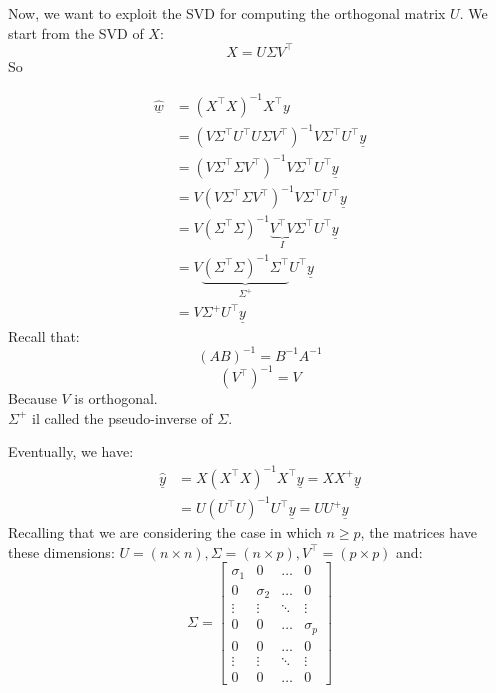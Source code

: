 Now, we want to exploit the SVD for computing the orthogonal matrix $U$. We start from the SVD of $X$:
\[
    X = U\Sigma V^\intercal    
\]
So
\begin{multicols}{2}
    \[
    \begin{split}
        \underline{\hat{w}} &= (X^\intercal X)^{-1} X^\intercal y\\
        & = (V\Sigma^\intercal U^\intercal U\Sigma V^\intercal)^{-1} V\Sigma^\intercal U^\intercal \underline{y} \\
        & = (V\Sigma^\intercal \Sigma V^\intercal)^{-1} V\Sigma^\intercal U^\intercal \underline{y}\\
        & = V(V\Sigma^\intercal \Sigma V^\intercal)^{-1} V\Sigma^\intercal U^\intercal \underline{y}\\
        & = V(\Sigma^\intercal \Sigma)^{-1} \underbrace{V^\intercal V}_{I}\Sigma^\intercal U^\intercal \underline{y}\\
        & = V\underbrace{(\Sigma^\intercal \Sigma)^{-1} \Sigma^\intercal}_{\Sigma^+} U^\intercal \underline{y}\\ 
        & = V\Sigma^+ U^\intercal \underline{y}
    \end{split}
\]
Recall that:
\[
(AB)^{-1} = B^{-1} A^{-1}    
\]
\[
(V^\intercal)^{-1} = V     
\]
Because $V$ is orthogonal.\\
$\Sigma^+$ il called the pseudo-inverse of $\Sigma$.
\end{multicols}
Eventually, we have:
\[
    \begin{split}
        \underline{\hat{y}} &= X(X^\intercal X)^{-1} X^\intercal \underline{y} = XX^+ \underline{y}\\ 
        &= U(U^\intercal U)^{-1} U^\intercal \underline{y} = UU^+ \underline{y}
    \end{split}
\]
Recalling that we are considering the case in which $n \geq p$, the matrices have these dimensions: $U = (n \times n), \Sigma = (n \times p), V^\intercal = (p \times p)$ and:
\[
    \Sigma = \begin{bmatrix}
        \sigma_1 & 0 & \dots & 0\\
        0 & \sigma_2 & \dots & 0\\
        \vdots & \vdots & \ddots & \vdots\\
        0 & 0 & \dots & \sigma_p\\
        0 & 0 & \dots & 0\\
        \vdots & \vdots & \ddots & \vdots\\
        0 & 0 & \dots & 0
    \end{bmatrix}
\]
